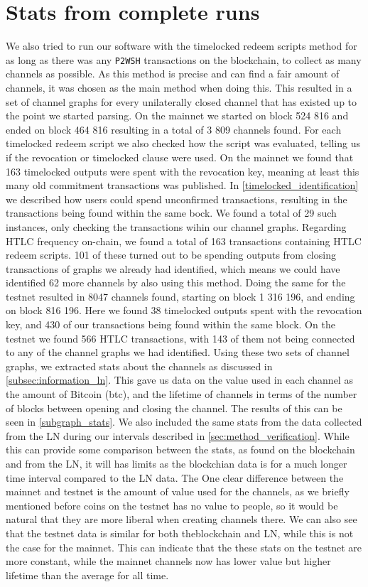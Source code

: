 \section{Stats from complete runs}
\label{sec:fullrun}

We also tried to run our software with the timelocked redeem scripts method for as long as there was any {\tt P2WSH} transactions on the blockchain, to collect as many channels as possible. As this method is precise and can find a fair amount of channels, it was chosen as the main method when doing this. This resulted in a set of channel graphs for every unilaterally closed channel that has existed up to the point we started parsing. On the mainnet we started on block 524 816 and ended on block 464 816 resulting in a total of 3 809 channels found. For each timelocked redeem script we also checked how the script was evaluated, telling us if the revocation or timelocked clause were used. On the mainnet we found that 163 timelocked outputs were spent with the revocation key, meaning at least this many old commitment transactions was published. In \cref{timelocked_identification} we described how users could spend unconfirmed transactions, resulting in the transactions being found within the same bock. We found a total of 29 such instances, only checking the transactions wihin our channel graphs.
Regarding HTLC frequency on-chain, we found a total of 163 transactions containing HTLC redeem scripts. 101 of these turned out to be spending outputs from closing transactions of graphs we already had identified, which means we could have identified 62 more channels by also using this method.
Doing the same for the testnet resulted in 8047 channels found, starting on block 1 316 196, and ending on block 816 196. Here we found 38 timelocked outputs spent with the revocation key, and 430 of our transactions being found within the same block. On the testnet we found 566 HTLC transactions, with 143 of them not being connected to any of the channel graphs we had identified. 
Using these two sets of channel graphs, we extracted stats about the channels as discussed in \cref{subsec:information_ln}. This gave us  data on the value used in each channel as the amount of Bitcoin (btc), and the lifetime of channels in terms of the number of blocks between opening and closing the channel. The results of this can be seen in \cref{subgraph_stats}.
We also included the same stats from the data collected from the LN during our intervals described in \cref{sec:method_verification}. 
While this can provide some comparison between the stats, as found on the blockchain and from the LN, it will has limits as the blockchian data is for a much longer time interval compared to the LN data.
The One clear difference between the mainnet and testnet is the amount of value used for the channels, as we briefly mentioned before coins on the testnet has no value to people, so it would be natural that they are more liberal when creating channels there. We can also see that the testnet data is similar for both theblockchain and LN, while this is not the case for the mainnet. This can indicate that the these stats on the testnet are more constant, while the mainnet channels now has lower value but higher lifetime than the average for all time.
\\

